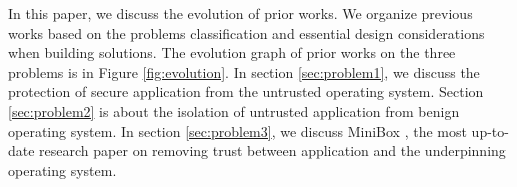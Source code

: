 In this paper, we discuss the evolution of prior works. We organize previous
works based on the problems classification and essential design considerations
when building solutions. The evolution graph of prior works on the three
problems is in Figure \ref{fig:evolution}. In section \ref{sec:problem1}, we
discuss the protection of secure application from the untrusted operating
system. Section \ref{sec:problem2} is about the isolation of untrusted
application from benign operating system. In section \ref{sec:problem3}, we
discuss MiniBox \cite{MiniBox}, the most up-to-date research paper on removing
trust between application and the underpinning operating system. 
